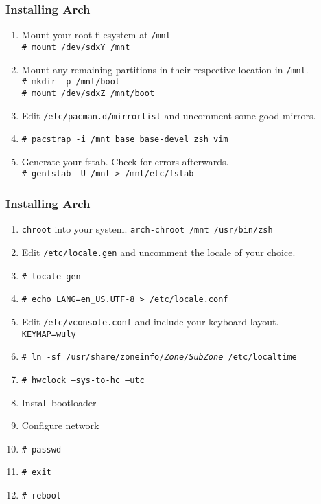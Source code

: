 \documentclass[mathserif]{beamer}
\begin{document}
\begin{frame}
    \frametitle{Installing Arch}
    \begin{enumerate}[<+->]
            \setcounter{enumi}{\value{enumresume}}
        \item Mount your root filesystem at \texttt{/mnt}\\
            \texttt{\# mount /dev/sdxY /mnt}
        \item Mount any remaining partitions in their respective location in
            \texttt{/mnt}.\\
            \texttt{\# mkdir -p /mnt/boot\\\# mount /dev/sdxZ /mnt/boot}
        \item Edit \texttt{/etc/pacman.d/mirrorlist} and uncomment some good
            mirrors.
        \item \texttt{\# pacstrap -i /mnt base base-devel zsh vim}
        \item Generate your fstab. Check for errors afterwards.\\
            \texttt{\# genfstab -U /mnt > /mnt/etc/fstab}
    \end{enumerate}
\end{frame}
\setcounter{enumresume}{\value{enumi}}

\begin{frame}
    \frametitle{Installing Arch}
    \begin{enumerate}[<+->]
            \setcounter{enumi}{\value{enumresume}}
        \item \texttt{chroot} into your system.
            \texttt{arch-chroot /mnt /usr/bin/zsh}
        \item Edit \texttt{/etc/locale.gen} and uncomment the locale of your
            choice.
        \item \texttt{\# locale-gen}
        \item \texttt{\# echo LANG=en\_US.UTF-8 > /etc/locale.conf}
        \item Edit \texttt{/etc/vconsole.conf} and include your keyboard
            layout.\\
            \texttt{KEYMAP=wuly}
        \item \texttt{\# ln -sf /usr/share/zoneinfo/\emph{Zone}/\emph{SubZone} /etc/localtime}
        \item \texttt{\# hwclock --sys-to-hc --utc}
        \item Install bootloader
        \item Configure network
        \item \texttt{\# passwd}
        \item \texttt{\# exit}
        \item \texttt{\# reboot}
    \end{enumerate}
\end{frame}
\end{document}
